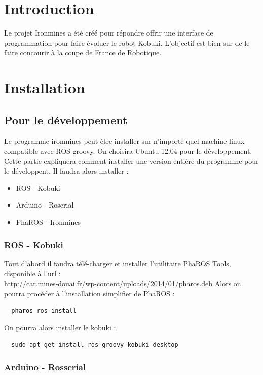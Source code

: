 \documentclass[a4paper, 11pt]{article}
\begin{document}
\section{Introduction}

Le projet Ironmines a été créé pour répondre offrir une interface de
programmation pour faire évoluer le robot Kobuki. L'objectif est
bien-sur de le faire concourir à la coupe de France de Robotique.

\section{Installation}
\subsection{Pour le développement}
Le programme ironmines peut être installer sur n'importe quel machine
linux compatible avec ROS groovy. On choisira Ubuntu 12.04 pour le
développement. Cette partie expliquera comment installer une version
entière du programme pour le développent. Il faudra alors installer :
\begin{itemize}
\item ROS - Kobuki
\item Arduino - Roserial
\item PhaROS - Ironmines
\end{itemize}

\subsubsection{ROS - Kobuki}

Tout d'abord il faudra télé-charger et installer l'utilitaire PhaROS
Tools, disponible à l'url :\\
\url{http://car.mines-douai.fr/wp-content/uploads/2014/01/pharos.deb}
Alors on pourra procéder à l'installation simplifier de PhaROS :

\begin{verbatim}
  pharos ros-install
\end{verbatim}
On pourra alors installer le kobuki :
\begin{verbatim}
  sudo apt-get install ros-groovy-kobuki-desktop
\end{verbatim}

\subsubsection{Arduino - Rosserial}
\end{document}
